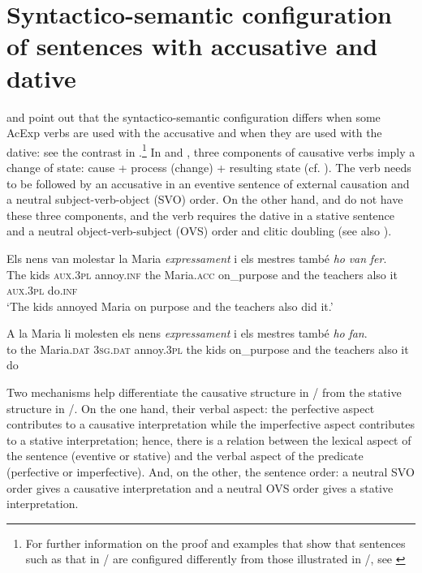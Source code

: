 \documentclass[output=paper,colorlinks,citecolor=brown,modfonts,nonflat]{langsci/langscibook}
\begin{document}
\section{Syntactico-semantic configuration of sentences with accusative and dative}\label{sec:royo:2}

\citet{Ynglès1991} and \citet{CabréMateu1998} point out that the syntactico-semantic configuration differs when some AcExp verbs are used with the accusative and when they are used with the dative: see the contrast in .\footnote{For further information on the proof and examples that show that sentences such as that in  / are configured differently from those illustrated in /, see \citet[Section 4.1]{Royo2017}} In  and , three components of causative verbs imply a change of state: cause + process (change) + resulting state (cf. \citealt{LevinRappaportHovav1995, CabréMateu1998, Rossello2008}). The verb needs to be followed by an accusative in an eventive sentence of external causation and a neutral subject-verb-object (SVO) order. On the other hand,  and  do not have these three components, and the verb requires the dative in a stative sentence and a neutral object-verb-subject (OVS) order and clitic doubling (see also ).

\ea%
 \label{ex:royo:3}
 \ea \label{ex:royo:3a}
 \gll Els nens van molestar la Maria \emph{expressament} i els mestres també \emph{ho} \emph{van} \emph{fer}. \\
The kids \textsc{aux.3pl} annoy.\textsc{inf} the Maria.\textsc{acc} on\_purpose     and the teachers also     it  \textsc{aux.3pl} do.\textsc{inf}\\
 \glt ‘The kids annoyed Maria on purpose and the teachers also did it.’

 \ex \label{ex:royo:3b}
 \gll *A la Maria li molesten els nens \emph{expressament} i els mestres també \emph{ho} \emph{fan}.\\
  to the Maria.\textsc{dat} \textsc{3sg.dat} annoy.\textsc{3pl} the kids on\_purpose     and the teachers also    it   do\\
\glt

 \z
 \z

Two mechanisms help differentiate the causative structure in / from the stative structure in /. On the one hand, their verbal aspect: the perfective aspect contributes to a causative interpretation while the imperfective aspect contributes to a stative interpretation; hence, there is a relation between the lexical aspect of the sentence (eventive or stative) and the verbal aspect of the predicate (perfective or imperfective). And, on the other, the sentence order: a neutral SVO order gives a causative interpretation and a neutral OVS order gives a stative interpretation.
\end{document}
